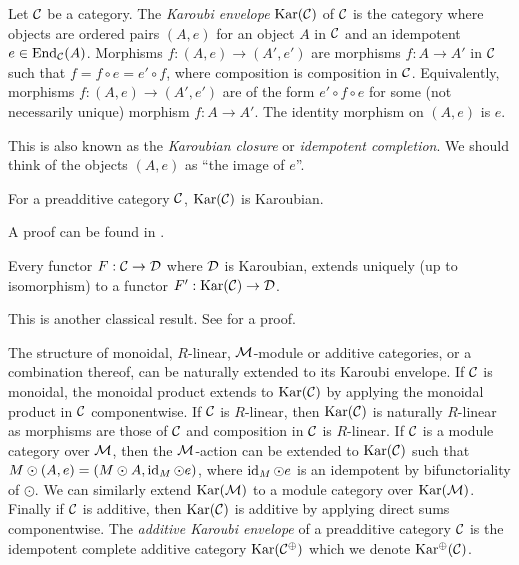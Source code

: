 \begin{definition}
    Let $\mathcal{C}$ be a category. The \textit{Karoubi envelope} $\operatorname{Kar}(\mathcal{C})$ of $\mathcal{C}$ is the category where objects are ordered pairs $(A,e)$ for an object $A$ in $\mathcal{C}$ and an idempotent $e \in \operatorname{End}_{\mathcal{C}}(A)$.  Morphisms $f: (A, e) \to (A', e')$ are morphisms $f:A \to A'$ in $\mathcal{C}$ such that $f = f \circ e = e' \circ f$, where composition is composition in $\mathcal{C}$. Equivalently, morphisms $f: (A, e) \to (A', e')$ are of the form $e'\circ f \circ e$ for some (not necessarily unique) morphism $f: A \to A'$. The identity morphism on $(A,e)$ is $e$.
\end{definition}

This is also known as the \textit{Karoubian closure} or \textit{idempotent completion}. We should think of the objects $(A,e)$ as ``the image of $e$''.

\begin{proposition}
    For a preadditive category $\mathcal{C}$, $\operatorname{Kar}(\mathcal{C})$ is Karoubian.
\end{proposition}

A proof can be found in \cite[Lemma 11.17]{intro-soergel-bimodules}.

\begin{lemma}
    Every functor $F: \mathcal{C} \to \mathcal{D}$ where $\mathcal{D}$ is Karoubian, extends uniquely (up to isomorphism) to a functor $F': \operatorname{Kar}(\mathcal{C}) \to \mathcal{D}$.
\end{lemma}

This is another classical result. See \cite[Proposition 6.5.9 (1)]{borceux-categorical-algebra} for a proof.

The structure of monoidal, $R$-linear, $\mathcal{M}$-module or additive categories, or a combination thereof, can be naturally extended to its Karoubi envelope. If $\mathcal{C}$ is monoidal, the monoidal product extends to $\operatorname{Kar}(\mathcal{C})$ by applying the monoidal product in $\mathcal{C}$ componentwise. If $\mathcal{C}$ is $R$-linear, then $\operatorname{Kar}(\mathcal{C})$ is naturally $R$-linear as morphisms are those of $\mathcal{C}$ and composition in $\mathcal{C}$ is $R$-linear. If $\mathcal{C}$ is a module category over $\mathcal{M}$, then the $\mathcal{M}$-action can be extended to $\operatorname{Kar}(\mathcal{C})$ such that $M \odot (A,e) = (M \odot A, \operatorname{id}_M \odot e)$, where $\operatorname{id}_M \odot e$ is an idempotent by bifunctoriality of $\odot$. We can similarly extend $\operatorname{Kar}(\mathcal{M})$ to a module category over $\operatorname{Kar}(\mathcal{M})$. Finally if $\mathcal{C}$ is additive, then $\operatorname{Kar}(\mathcal{C})$ is additive by applying direct sums componentwise. The \textit{additive Karoubi envelope} of a preadditive category $\mathcal{C}$ is the idempotent complete additive category $\operatorname{Kar}(\mathcal{C}^\oplus)$ which we denote $\operatorname{Kar^\oplus}(\mathcal{C})$.

